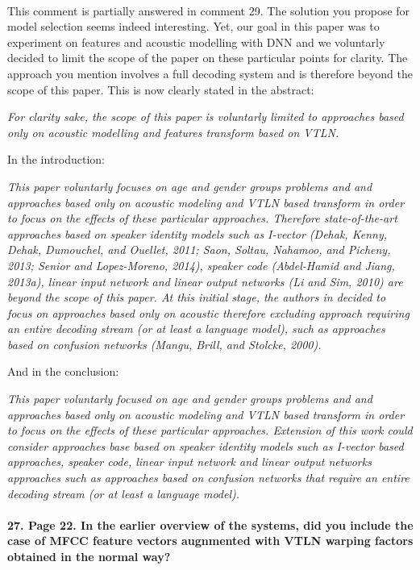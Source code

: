 \documentclass[]{article}
\begin{document}
~

This comment is partially answered in comment 29. The solution you propose for model selection seems indeed interesting. Yet, our goal in this paper was to experiment on features and acoustic modelling with DNN and we voluntarly decided to limit the scope of the paper on these particular points for clarity. The approach you mention involves a full decoding system and is therefore beyond the scope of this paper. This is now clearly stated in the abstract:

\textit{For clarity sake, the scope of this paper is voluntarly limited to approaches based only on acoustic modelling and features transform based on VTLN.}

In the introduction:

\textit{This paper voluntarly focuses on age and gender groups problems and and approaches based only on acoustic modeling and VTLN based transform in order to focus on the effects of these particular approaches. Therefore state-of-the-art approaches based on speaker identity models such as I-vector (Dehak, Kenny, Dehak, Dumouchel, and Ouellet, 2011; Saon, Soltau, Nahamoo, and Picheny, 2013; Senior
and Lopez-Moreno, 2014), speaker code (Abdel-Hamid and Jiang, 2013a), linear input network and linear output networks (Li and Sim, 2010) are beyond the scope of this paper. At this initial stage, the authors in decided to focus on approaches based only on acoustic therefore excluding approach requiring an entire decoding stream (or at least a language model), such as approaches based on confusion networks (Mangu, Brill, and Stolcke, 2000).}

And in the conclusion:

\textit{This paper voluntarly focused on age and gender groups problems and and approaches based only on acoustic modeling and VTLN based transform in order to focus on the effects of these particular approaches. Extension of this work could consider approaches base based on speaker identity models such as I-vector based approaches, speaker code, linear input network and linear output networks approaches such as approaches based on confusion networks that require an entire decoding stream (or at least a language model).}
\paragraph{27. Page 22. In the earlier overview of the systems, did you include the case of MFCC feature vectors augnmented with VTLN warping factors obtained in the normal way?}
\end{document}
